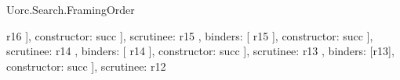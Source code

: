 \begin{lexlean}{Uorc.Search.FramingOrder}
\begin{semanticmodule}
{{{{{{{{{{{{{{{{{{{{{{{{{{{{{{{{{                                                                                                    r16
                                                                                                  ],
                                                                                                  constructor: succ
                                                                                                }
                                                                                              ],
                                                                                              scrutinee: r15
                                                                                            },
                                                                                            binders: [
                                                                                              r15
                                                                                            ],
                                                                                            constructor: succ
                                                                                          }
                                                                                        ],
                                                                                        scrutinee: r14
                                                                                      },
                                                                                      binders: [
                                                                                        r14
                                                                                      ],
                                                                                      constructor: succ
                                                                                    }
                                                                                  ],
                                                                                  scrutinee: r13
                                                                                },
                                                                                binders: [r13],
                                                                                constructor: succ
                                                                              }
                                                                            ],
                                                                            scrutinee: r12
}}}}}}}}}}}}}}}}}}}}}}}}}}
\end{semanticmodule}
\end{lexlean}
